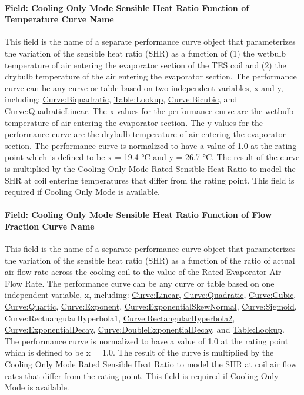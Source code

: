 \paragraph{Field: Cooling Only Mode Sensible Heat Ratio Function of Temperature Curve Name}\label{field-cooling-only-mode-sensible-heat-ratio-function-of-temperature-curve-name}

This field is the name of a separate performance curve object that parameterizes the variation of the sensible heat ratio (SHR) as a function of (1) the wetbulb temperature of air entering the evaporator section of the TES coil and (2) the drybulb temperature of the air entering the evaporator section. The performance curve can be any curve or table based on two independent variables, x and y, including: \hyperref[curvebiquadratic]{Curve:Biquadratic}, \hyperref[tablelookup]{Table:Lookup}, \hyperref[curvebicubic]{Curve:Bicubic}, and \hyperref[curvequadraticlinear]{Curve:QuadraticLinear}. The x values for the performance curve are the wetbulb temperature of air entering the evaporator section. The y values for the performance curve are the drybulb temperature of air entering the evaporator section. The performance curve is normalized to have a value of 1.0 at the rating point which is defined to be x = 19.4 °C and y = 26.7 °C. The result of the curve is multiplied by the Cooling Only Mode Rated Sensible Heat Ratio to model the SHR at coil entering temperatures that differ from the rating point. This field is required if Cooling Only Mode is available.

\paragraph{Field: Cooling Only Mode Sensible Heat Ratio Function of Flow Fraction Curve Name}\label{field-cooling-only-mode-sensible-heat-ratio-function-of-flow-fraction-curve-name}

This field is the name of a separate performance curve object that parameterizes the variation of the sensible heat ratio (SHR) as a function of the ratio of actual air flow rate across the cooling coil to the value of the Rated Evaporator Air Flow Rate. The performance curve can be any curve or table based on one independent variable, x, including: \hyperref[curvelinear]{Curve:Linear}, \hyperref[curvequadratic]{Curve:Quadratic}, \hyperref[curvecubic]{Curve:Cubic}, \hyperref[curvequartic]{Curve:Quartic}, \hyperref[curveexponent]{Curve:Exponent}, \hyperref[curveexponentialskewnormal]{Curve:ExponentialSkewNormal}, \hyperref[curvesigmoid]{Curve:Sigmoid}, Curve:RectuangularHyperbola1, \hyperref[curverectangularhyperbola2]{Curve:RectangularHyperbola2}, \hyperref[curveexponentialdecay]{Curve:ExponentialDecay}, \hyperref[curvedoubleexponentialdecay]{Curve:DoubleExponentialDecay}, and \hyperref[tablelookup]{Table:Lookup}. The performance curve is normalized to have a value of 1.0 at the rating point which is defined to be x = 1.0. The result of the curve is multiplied by the Cooling Only Mode Rated Sensible Heat Ratio to model the SHR at coil air flow rates that differ from the rating point. This field is required if Cooling Only Mode is available.

